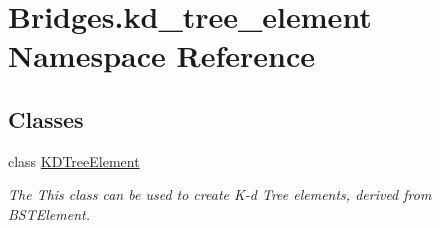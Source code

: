 \hypertarget{namespace_bridges_1_1kd__tree__element}{}\section{Bridges.\+kd\+\_\+tree\+\_\+element Namespace Reference}
\label{namespace_bridges_1_1kd__tree__element}
\subsection*{Classes}
\begin{DoxyCompactItemize}
\item 
class \hyperlink{class_bridges_1_1kd__tree__element_1_1_k_d_tree_element}{K\+D\+Tree\+Element}
\begin{DoxyCompactList}\small\item\em The This class can be used to create K-\/d Tree elements, derived from B\+S\+T\+Element. \end{DoxyCompactList}\end{DoxyCompactItemize}
